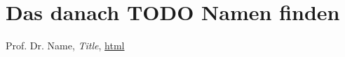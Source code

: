 \documentclass[11pt,twocolumn,a4paper,DIV=calc]{scrartcl}
\begin{document}
\section{Das danach TODO Namen finden}
\begin{thebibliography}{99}
  Prof. Dr. Name, \emph{Title}, \url{html}
\end{thebibliography}
\end{document}
